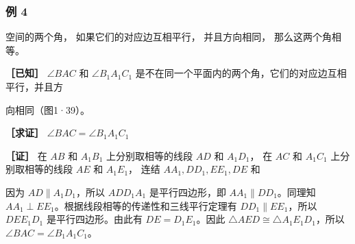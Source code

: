 \subsubsection{例 4}

空间的两个角， 如果它们的对应边互相平行， 并且方向相同，
那么这两个角相等。

\textbf{［已知］} \(\angle BAC\) 和 \(\angle B_{1}A_{1}C_{1}\)
是不在同一个平面内的两个角，它们的对应边互相平行，并且方

向相同（图1·39）。

\textbf{［求证］} \(\angle BAC = \angle B_{1}A_{1}C_{1}\)

\textbf{［证］} 在 \(AB\) 和 \(A_{1}B_{1}\) 上分别取相等的线段 \(AD\) 和
\(A_{1}D_{1}\)， 在 \(AC\) 和 \(A_{1}C_{1}\) 上分别取相等的线段 \(AE\)
和 \(A_{1}E_{1}\)， 连结 \(AA_{1}, DD_{1}, EE_{1}, DE\) 和

因为 \(AD \parallel A_1D_1\)，所以 \(ADD_1A_1\) 是平行四边形，即
\(AA_1 \parallel DD_1\)。同理知
\(AA_1 \perp EE_1\)。根据线段相等的传递性和三线平行定理有
\(DD_1 \parallel EE_1\)，所以 \(DEE_1D_1\) 是平行四边形。由此有
\(DE = D_1E_1\)。因此 \(\triangle AED \cong \triangle A_1E_1D_1\)，所以
\(\angle BAC = \angle B_1A_1C_1\)。

